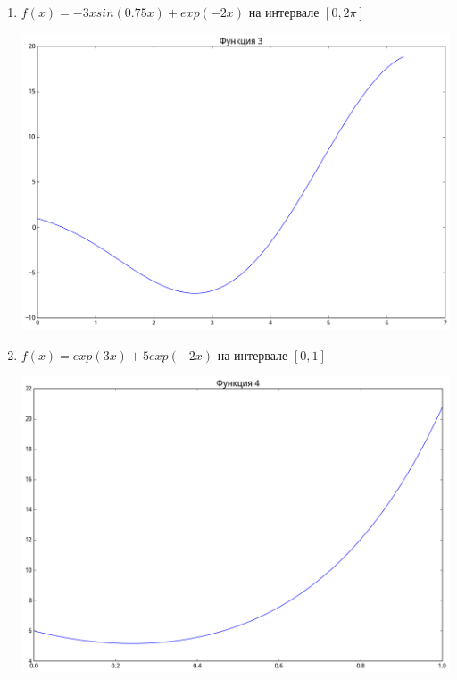 \documentclass[12pt, a4paper]{article}
\begin{document}
\begin{enumerate}
            \item $f(x) = -3x sin(0.75x) + exp(-2x)$ на интервале $[0, 2\pi]$
                \begin{center}\includegraphics[width=\picwidth, height=\picheight]{fun3.png}\end{center}

            \item $f(x) = exp(3x) + 5 exp(-2x)$ на интервале $[0, 1]$
                \begin{center}\includegraphics[width=\picwidth, height=\picheight]{fun4.png}\end{center}


\end{enumerate}
\end{document}
